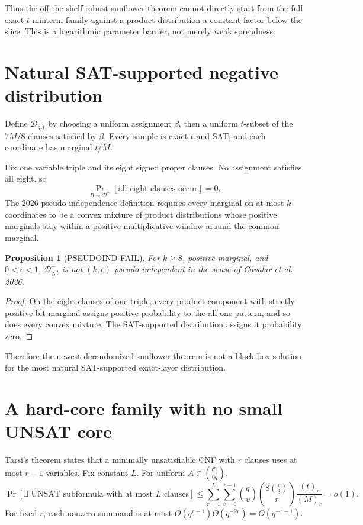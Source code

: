 \documentclass[11pt]{article}
\newtheorem{proposition}{Proposition}
\begin{document}
Thus the off-the-shelf robust-sunflower theorem cannot directly start from the full exact-\(t\) minterm family against a product distribution a constant factor below the slice. This is a logarithmic parameter barrier, not merely weak spreadness.

\section{Natural SAT-supported negative distribution}

Define \(\mathcal D^-_{q,t}\) by choosing a uniform assignment \(\beta\), then a uniform \(t\)-subset of the \(7M/8\) clauses satisfied by \(\beta\). Every sample is exact-\(t\) and SAT, and each coordinate has marginal \(t/M\).

Fix one variable triple and its eight signed proper clauses. No assignment satisfies all eight, so
\[
\Pr_{B\sim\mathcal D^-}[\text{all eight clauses occur}]=0.
\]
The 2026 pseudo-independence definition requires every marginal on at most \(k\) coordinates to be a convex mixture of product distributions whose positive marginals stay within a positive multiplicative window around the common marginal.

\begin{proposition}[PSEUDOIND-FAIL]
For \(k\ge8\), positive marginal, and \(0<\epsilon<1\), \(\mathcal D^-_{q,t}\) is not \((k,\epsilon)\)-pseudo-independent in the sense of Cavalar et al. 2026.
\end{proposition}
\begin{proof}
On the eight clauses of one triple, every product component with strictly positive bit marginal assigns positive probability to the all-one pattern, and so does every convex mixture. The SAT-supported distribution assigns it probability zero.
\end{proof}

Therefore the newest derandomized-sunflower theorem is not a black-box solution for the most natural SAT-supported exact-layer distribution.

\section{A hard-core family with no small UNSAT core}

Tarsi's theorem states that a minimally unsatisfiable CNF with \(r\) clauses uses at most \(r-1\) variables. Fix constant \(L\). For uniform \(A\in\binom{\mathcal C_q}{6q}\),
\[
\Pr[\exists\text{ UNSAT subformula with at most }L\text{ clauses}]
\le
\sum_{r=1}^{L}\sum_{v=0}^{r-1}
\binom qv
\binom{8\binom v3}{r}
\frac{(t)_r}{(M)_r}
=o(1).
\]
For fixed \(r\), each nonzero summand is at most \(O(q^{r-1})O(q^{-2r})=O(q^{-r-1})\).
\end{document}
